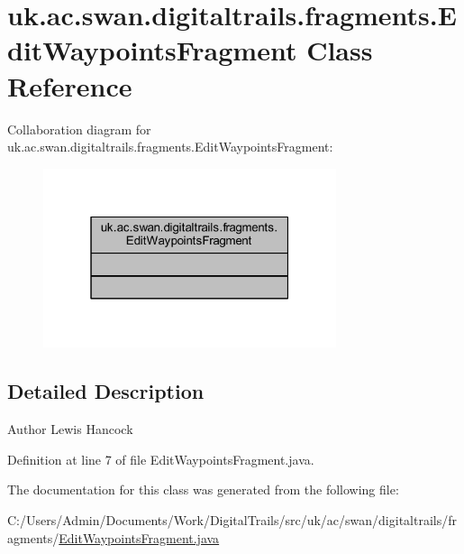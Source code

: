\hypertarget{classuk_1_1ac_1_1swan_1_1digitaltrails_1_1fragments_1_1_edit_waypoints_fragment}{\section{uk.\+ac.\+swan.\+digitaltrails.\+fragments.\+Edit\+Waypoints\+Fragment Class Reference}
\label{classuk_1_1ac_1_1swan_1_1digitaltrails_1_1fragments_1_1_edit_waypoints_fragment}
}


Collaboration diagram for uk.\+ac.\+swan.\+digitaltrails.\+fragments.\+Edit\+Waypoints\+Fragment\+:
\nopagebreak
\begin{figure}[H]
\begin{center}
\leavevmode
\includegraphics[width=244pt]{classuk_1_1ac_1_1swan_1_1digitaltrails_1_1fragments_1_1_edit_waypoints_fragment__coll__graph}
\end{center}
\end{figure}


\subsection{Detailed Description}
\begin{DoxyAuthor}{Author}
Lewis Hancock 
\end{DoxyAuthor}


Definition at line 7 of file Edit\+Waypoints\+Fragment.\+java.



The documentation for this class was generated from the following file\+:\begin{DoxyCompactItemize}
\item 
C\+:/\+Users/\+Admin/\+Documents/\+Work/\+Digital\+Trails/src/uk/ac/swan/digitaltrails/fragments/\hyperlink{_edit_waypoints_fragment_8java}{Edit\+Waypoints\+Fragment.\+java}\end{DoxyCompactItemize}
